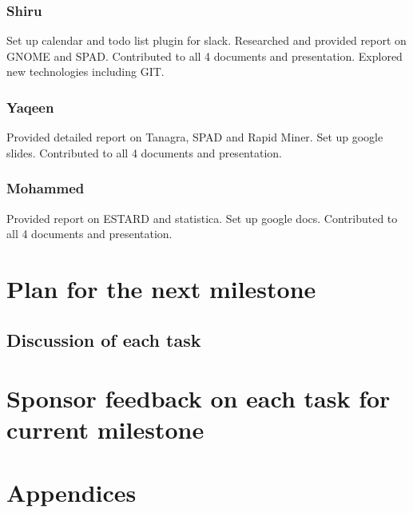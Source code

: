 \documentclass[11pt]{article}
\begin{document}
	\subsubsection{Shiru}
	Set up calendar and todo list plugin for slack. Researched and provided report on GNOME and SPAD. Contributed to all 4 documents and presentation. Explored new technologies including GIT. 
	\subsubsection{Yaqeen}
	Provided detailed report on Tanagra, SPAD and Rapid Miner. Set up google slides. Contributed to all 4 documents and presentation.
	\subsubsection{Mohammed}
	Provided report on ESTARD and statistica. Set up google docs. Contributed to all 4 documents and presentation.
	\section{Plan for the next milestone}
	\subsection{Discussion of each task}
	\section{Sponsor feedback on each task for current milestone}
	\pagebreak
	\section{Appendices}
\end{document}
